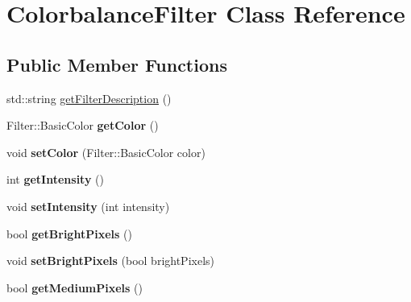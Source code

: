 \hypertarget{classFilter_1_1ColorbalanceFilter}{}\section{Colorbalance\+Filter Class Reference}
\label{classFilter_1_1ColorbalanceFilter}
\subsection*{Public Member Functions}
\begin{DoxyCompactItemize}
\item 
std\+::string \hyperlink{classFilter_1_1ColorbalanceFilter_a2b3f7d8fcd3d774b4a2fde5914a9729f}{get\+Filter\+Description} ()
\item 
\hypertarget{classFilter_1_1ColorbalanceFilter_a887af3672c130cfa50175017b21d2fa7}{}Filter\+::\+Basic\+Color {\bfseries get\+Color} ()\label{classFilter_1_1ColorbalanceFilter_a887af3672c130cfa50175017b21d2fa7}

\item 
\hypertarget{classFilter_1_1ColorbalanceFilter_a50545a889a67d50a4e460815f518318a}{}void {\bfseries set\+Color} (Filter\+::\+Basic\+Color color)\label{classFilter_1_1ColorbalanceFilter_a50545a889a67d50a4e460815f518318a}

\item 
\hypertarget{classFilter_1_1ColorbalanceFilter_a708995fb1b6acb31ee0dfb0f4881e5b5}{}int {\bfseries get\+Intensity} ()\label{classFilter_1_1ColorbalanceFilter_a708995fb1b6acb31ee0dfb0f4881e5b5}

\item 
\hypertarget{classFilter_1_1ColorbalanceFilter_ac8255ffbc46bb61acaa8fd23d0d260eb}{}void {\bfseries set\+Intensity} (int intensity)\label{classFilter_1_1ColorbalanceFilter_ac8255ffbc46bb61acaa8fd23d0d260eb}

\item 
\hypertarget{classFilter_1_1ColorbalanceFilter_a1be0d343ed58d5d5bf7b816da375f190}{}bool {\bfseries get\+Bright\+Pixels} ()\label{classFilter_1_1ColorbalanceFilter_a1be0d343ed58d5d5bf7b816da375f190}

\item 
\hypertarget{classFilter_1_1ColorbalanceFilter_af0f286aa4c54fb1fd5813d02799da1cb}{}void {\bfseries set\+Bright\+Pixels} (bool bright\+Pixels)\label{classFilter_1_1ColorbalanceFilter_af0f286aa4c54fb1fd5813d02799da1cb}

\item 
\hypertarget{classFilter_1_1ColorbalanceFilter_a71d3e0e416aa251b66678a14b4bfa1a1}{}bool {\bfseries get\+Medium\+Pixels} ()\label{classFilter_1_1ColorbalanceFilter_a71d3e0e416aa251b66678a14b4bfa1a1}


\end{DoxyCompactItemize}
